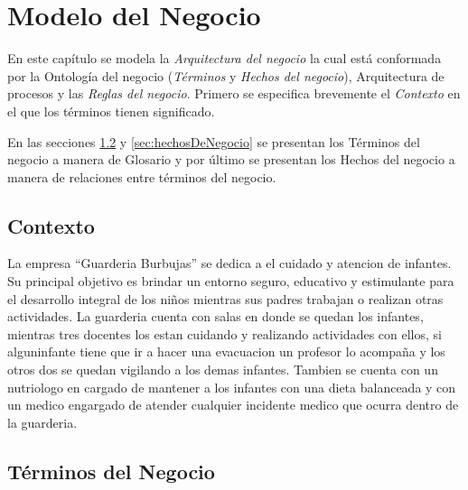 \chapter{Modelo del Negocio}	
\label{cap:reqSist}

	En este capítulo se modela la {\em Arquitectura del negocio} la cual está conformada por la Ontología del negocio ({\em Términos} y {\em Hechos del negocio}), Arquitectura de procesos y las {\em Reglas del negocio}. Primero se especifica brevemente el {\em Contexto} en el que los términos tienen significado.
	
	En las secciones \ref{sec:terminosDeNegocio} y \ref{sec:hechosDeNegocio} se presentan los Términos del negocio a manera de Glosario y por último se presentan los Hechos del negocio a manera de relaciones entre términos del negocio.

\section{Contexto}

	La empresa ``Guarderia Burbujas'' se dedica a el cuidado y atencion de infantes. Su principal objetivo es brindar un entorno seguro, educativo y estimulante para el desarrollo integral de los niños mientras sus padres trabajan o realizan otras actividades.
    La guarderia cuenta con salas en donde se quedan los infantes, mientras tres docentes los estan cuidando y realizando actividades con ellos, si alguninfante tiene que ir a hacer una evacuacion un profesor lo acompaña y los otros dos se quedan vigilando a los demas infantes.
    Tambien se cuenta con un nutriologo en cargado de mantener a los infantes con una dieta balanceada y con un medico engargado de atender cualquier incidente medico que ocurra dentro de la guarderia.
	
\section{Términos del Negocio}
\label{sec:terminosDeNegocio}

